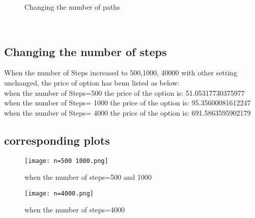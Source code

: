 \documentclass[14pt]{extarticle}
\begin{document}
\begin{figure}[htbp]
\centering

%
%

%
%

\centering
\caption{ Changing the number of paths}
\end{figure}



~\\
\subsection{Changing the number of steps}
When the number of Steps increased to 500,1000, 40000 with other setting unchanged, the  price of option has benn listed as below:\\
when the number of Steps=500
the price of the option is: 51.05317730375977\\
when the number of Steps= 1000
the price of the option is: 95.35600081612247\\
when the number of Steps= 4000
the price of the option is: 691.5863595902179\\

\subsection{corresponding plots}

\begin{figure}[htbp] 
    \centering 
    \texttt{[image: n=500 1000.png]}
\caption{ when the number of steps=500 and 1000}
 \end{figure}


\begin{figure}[htbp] 
    \centering 
    \texttt{[image: n=4000.png]}
\caption{when the number of steps=4000}
 \end{figure}
\end{document}
